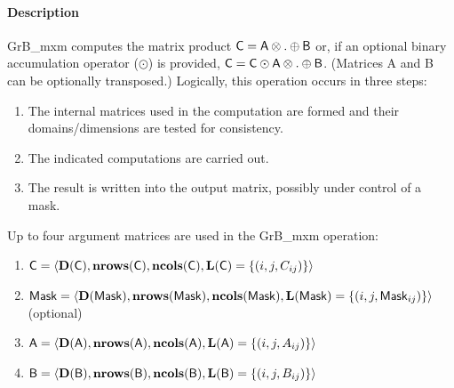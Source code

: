 \paragraph{Description}

{\sf GrB\_mxm} computes the matrix product ${\bf \sf C} = {\bf \sf
A} \otimes . \oplus {\bf \sf B}$ or, if an optional binary accumulation
operator ($\odot$) is provided, ${\bf \sf C} = {\bf \sf C} \odot
{\bf \sf A} \otimes . \oplus {\bf \sf B}$.  (Matrices {\sf A}
and {\sf B} can be optionally transposed.)  Logically, this operation
occurs in three steps:
\begin{enumerate}
\item The internal matrices used in the computation are formed and their domains/dimensions are tested for consistency.
\item The indicated computations are carried out.
\item The result is written into the output matrix, possibly under control of a mask.
\end{enumerate}

Up to four argument matrices are used in the {\sf GrB\_mxm} operation:
\begin{enumerate}
\item ${\bf \sf C} = \langle \bold{D}({\sf C}),\bold{nrows}({\bf \sf C}),\bold{ncols}({\bf \sf C}),\bold{L}({\bf \sf C}) = \{(i,j,C_{ij}) \} \rangle$
\item ${\bf \sf Mask} = \langle \bold{D}({\sf Mask}),\bold{nrows}({\bf \sf Mask}),\bold{ncols}({\bf \sf Mask}),\bold{L}({\bf \sf Mask}) = \{(i,j,{\sf Mask}_{ij}) \} \rangle$ (optional)
\item ${\bf \sf A} = \langle \bold{D}({\sf A}),\bold{nrows}({\bf \sf A}), \bold{ncols}({\bf \sf A}),\bold{L}({\bf \sf A}) = \{(i,j,A_{ij}) \} \rangle$
\item ${\bf \sf B} = \langle \bold{D}({\sf B}),\bold{nrows}({\bf \sf B}), \bold{ncols}({\bf \sf B}),\bold{L}({\bf \sf B}) = \{(i,j,B_{ij}) \} \rangle$
\end{enumerate}


